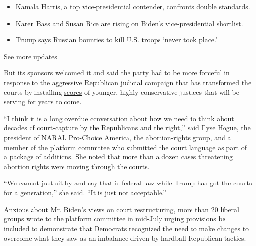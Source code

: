 \begin{itemize}
\tightlist
\item
  \href{https://www.nytimes.com/2020/07/31/us/elections/biden-vs-trump.html?action=click\&pgtype=Article\&state=default\&region=MAIN_CONTENT_1\&context=storylines_live_updates\#link-29fdff45}{Kamala
  Harris, a top vice-presidential contender, confronts double
  standards.}
\item
  \href{https://www.nytimes.com/2020/07/31/us/elections/biden-vs-trump.html?action=click\&pgtype=Article\&state=default\&region=MAIN_CONTENT_1\&context=storylines_live_updates\#link-13ec3d9c}{Karen
  Bass and Susan Rice are rising on Biden's vice-presidential
  shortlist.}
\item
  \href{https://www.nytimes.com/2020/07/31/us/elections/biden-vs-trump.html?action=click\&pgtype=Article\&state=default\&region=MAIN_CONTENT_1\&context=storylines_live_updates\#link-49e9a016}{Trump
  says Russian bounties to kill U.S. troops `never took place.'}
\end{itemize}

\href{https://www.nytimes.com/2020/07/31/us/elections/biden-vs-trump.html?action=click\&pgtype=Article\&state=default\&region=MAIN_CONTENT_1\&context=storylines_live_updates}{See
more updates}

But its sponsors welcomed it and said the party had to be more forceful
in response to the aggressive Republican judicial campaign that has
transformed the courts by installing
\href{https://www.nytimes.com/2020/03/14/us/trump-appeals-court-judges.html}{scores}
of younger, highly conservative justices that will be serving for years
to come.

``I think it is a long overdue conversation about how we need to think
about decades of court-capture by the Republicans and the right,'' said
Ilyse Hogue, the president of NARAL Pro-Choice America, the
abortion-rights group, and a member of the platform committee who
submitted the court language as part of a package of additions. She
noted that more than a dozen cases threatening abortion rights were
moving through the courts.

``We cannot just sit by and say that is federal law while Trump has got
the courts for a generation,'' she said. ``It is just not acceptable.''

Anxious about Mr. Biden's views on court restructuring, more than 20
liberal groups wrote to the platform committee in mid-July urging
provisions be included to demonstrate that Democrats recognized the need
to make changes to overcome what they saw as an imbalance driven by
hardball Republican tactics.

